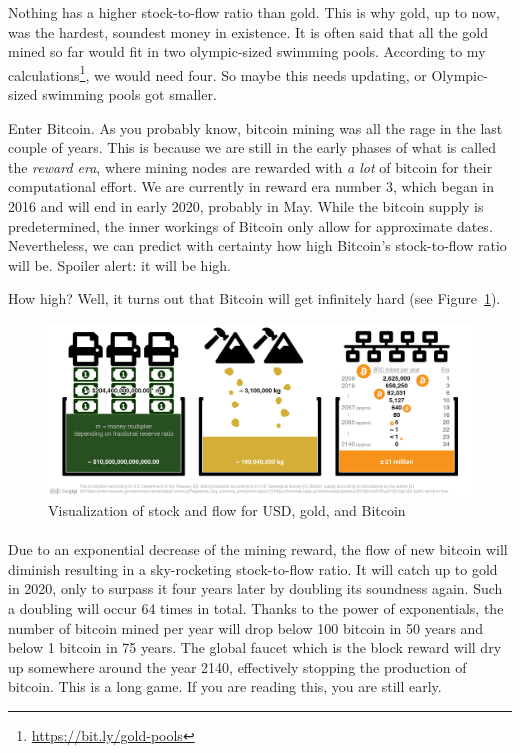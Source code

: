 Nothing has a higher stock-to-flow ratio than gold. This is why gold, up to now,
was the hardest, soundest money in existence. It is often said that all the gold
mined so far would fit in two olympic-sized swimming pools. According to my
calculations\footnote{\url{https://bit.ly/gold-pools}}, we would need four. So
maybe this needs updating, or Olympic-sized swimming pools got smaller.

Enter Bitcoin. As you probably know, bitcoin mining was all the rage in
the last couple of years. This is because we are still in the early
phases of what is called the \textit{reward era}, where mining nodes are
rewarded with \textit{a lot} of bitcoin for their computational effort. We are
currently in reward era number 3, which began in 2016 and will end in
early 2020, probably in May. While the bitcoin supply is predetermined,
the inner workings of Bitcoin only allow for approximate dates.
Nevertheless, we can predict with certainty how high Bitcoin's
stock-to-flow ratio will be. Spoiler alert: it will be high.

How high? Well, it turns out that Bitcoin will get infinitely hard (see
Figure~\ref{fig:stock-to-flow-white-cc-by-sources}).

\begin{figure}
  \includegraphics{assets/images/stock-to-flow-white-cc-by-sources.png}
  \caption{Visualization of stock and flow for USD, gold, and Bitcoin}
  \label{fig:stock-to-flow-white-cc-by-sources}
\end{figure}

\paragraph{}
Due to an exponential decrease of the mining reward, the flow of new
bitcoin will diminish resulting in a sky-rocketing stock-to-flow ratio.
It will catch up to gold in 2020, only to surpass it four years later by
doubling its soundness again. Such a doubling will occur 64 times in
total. Thanks to the power of exponentials, the number of bitcoin mined
per year will drop below 100 bitcoin in 50 years and below 1 bitcoin in
75 years. The global faucet which is the block reward will dry up
somewhere around the year 2140, effectively stopping the production of
bitcoin. This is a long game. If you are reading this, you are still
early.


